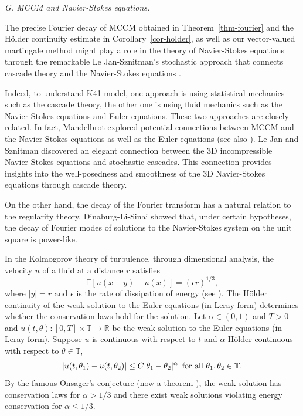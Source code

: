 \documentclass[12pt]{amsart}
\theoremstyle{definition}
\theoremstyle{remark}
\numberwithin{equation}{section}
\begin{document}
{\flushleft \it G.  MCCM and Navier-Stokes equations.}  


The  precise Fourier decay of MCCM obtained in Theorem~\ref{thm-fourier}  and  the H\"older continuity estimate in Corollary~\ref{cor-holder}, as well as our vector-valued martingale method might play a role in the theory of Navier-Stokes equations through the remarkable  Le Jan-Sznitman's stochastic approach that connects  cascade theory and  the Navier-Stokes equations \cite{LS97, DPT24, BC03, Way05}. 


Indeed,  to understand K41 model, one approach  is using statistical mechanics such as the cascade theory, the other one is using fluid mechanics such as the Navier-Stokes equations and Euler equations.  These two approaches are closely related. In fact, Mandelbrot \cite{M76} explored potential connections between MCCM and the Navier-Stokes equations as well as the Euler equations (see also \cite{W2002}).  Le Jan and Sznitman \cite{LS97} discovered an elegant connection between the 3D incompressible Navier-Stokes equations and stochastic cascades. This connection provides insights into the well-posedness and smoothness of the 3D Navier-Stokes equations through  cascade theory. 
 
 
 On the other hand, the decay of the Fourier transform has a natural relation to the regularity theory.  Dinaburg-Li-Sinai \cite{DLS10a,DLS10b} showed that, under certain hypotheses, the decay of Fourier modes of solutions to  the Navier-Stokes system on the unit square is power-like. 



In the Kolmogorov theory of turbulence, through dimensional analysis, the velocity $u$ of a fluid at a distance $r$ satisfies 
\[
\mathbb{E}[u(x+y)-u(x)]=(\epsilon r)^{1/3},
\]
where $|y|=r$ and $\epsilon$ is the rate of dissipation of energy (see \cite{CF94}). 
The H\"older continuity of the weak solution to the Euler equations (in Leray form) determines whether the conservation laws hold for the solution.  Let  $\alpha\in(0,1)$ and $T>0$ and
$u(t,\theta):[0,T]\times \mathbb{T}\to \mathbb{R}$ be the weak solution to the Euler equations (in Leray form).  Suppose $u$ is continuous with respect to $t$ and $\alpha$-H\"older continuous with respect to  $\theta \in \mathbb{T}$,
\[
|u(t,\theta_1)-u(t,\theta_2)|\leq C|\theta_1-\theta_2|^\alpha \text{\,\,\,for all\,\,}\theta_1,\theta_2\in \mathbb{T}.
\]
By the famous Onsager’s conjecture (now a theorem \cite{Eyi94, CEI94, Ise18}),    the weak solution has conservation laws for  $\alpha>1/3$ and  there exist weak solutions violating energy conservation for $\alpha \le 1/3$. 
\end{document}
